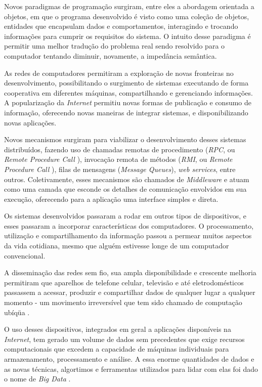 \documentclass[11pt,twoside,a4paper]{book}
\begin{document}
Novos paradigmas de programação surgiram, entre eles a abordagem orientada a objetos, em que o programa desenvolvido é visto como uma coleção de objetos, entidades que encapsulam dados e comportamentos, interagindo e trocando informações para cumprir os requisitos do sistema. O intuito desse paradigma é permitir uma melhor tradução do problema real sendo resolvido para o computador tentando diminuir, novamente, a impedância semântica.

As redes de computadores permitiram a exploração de novas fronteiras no desenvolvimento, possibilitando o surgimento de sistemas executando de forma cooperativa em diferentes máquinas, compartilhando e gerenciando informações. A popularização da \emph{Internet} permitiu novas formas de publicação e consumo de informação, oferecendo novas maneiras de integrar sistemas, e disponibilizando novas aplicações. 

Novos mecanismos surgiram para viabilizar o desenvolvimento desses sistemas distribuídos, fazendo uso de chamadas remotas de procedimento (\emph{RPC}, ou \emph{Remote Procedure Call} \cite{rpc}), invocação remota de métodos (\emph{RMI}, ou \emph{Remote Procedure Call} \cite{rmi}), filas de mensagens (\emph{Message Queues}), \emph{web services}, entre outros. Coletivamente, esses mecanismos são chamados de \emph{Middleware} \cite{alonso} e atuam como uma camada que esconde os detalhes de comunicação envolvidos em sua execução, oferecendo para a aplicação uma interface simples e direta.

Os sistemas desenvolvidos passaram a rodar em outros tipos de dispositivos, e esses passaram a incorporar características dos computadores. O processamento, utilização e compartilhamento da informação passou a permear muitos aspectos da vida cotidiana, mesmo que alguém estivesse longe de um computador convencional. 

A disseminação das redes sem fio, sua ampla disponibilidade e crescente melhoria permitiram que aparelhos de telefone celular, televisão e até eletrodomésticos passassem a acessar, produzir e compartilhar dados de qualquer lugar a qualquer momento - um movimento irreversível que tem sido chamado de computação ubíqüa \cite{ubiquitous}. 

O uso desses dispositivos, integrados em geral a aplicações disponíveis na \emph{Internet}, tem gerado um volume de dados sem precedentes que exige recursos computacionais que excedem a capacidade de máquinas individuais para armazenamento, processamento e análise. A essa enorme quantidades de dados e as novas técnicas, algortimos e ferramentas utilizados para lidar com elas foi dado o nome de \emph{Big Data} \cite{big_data}.
\end{document}
